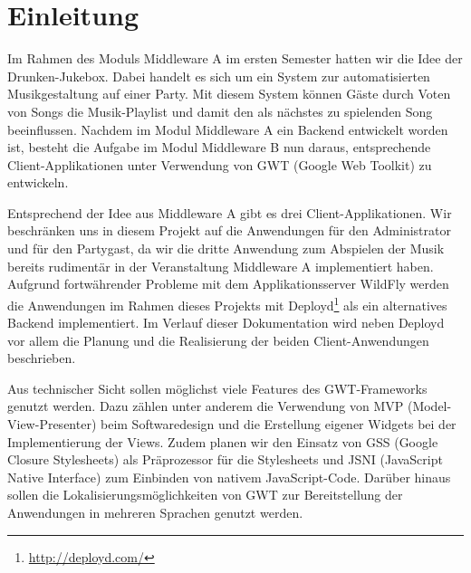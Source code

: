 \section{Einleitung}
Im Rahmen des Moduls Middleware A im ersten Semester hatten wir die Idee der Drunken-Jukebox. Dabei handelt es sich um ein System zur automatisierten Musikgestaltung auf einer Party. Mit diesem System können Gäste durch Voten von Songs die Musik-Playlist und damit den als nächstes zu spielenden Song beeinflussen. Nachdem im Modul Middleware A ein Backend entwickelt worden ist, besteht die Aufgabe im Modul Middleware B nun daraus, entsprechende Client-Applikationen unter Verwendung von GWT (Google Web Toolkit) zu entwickeln.

Entsprechend der Idee aus Middleware A gibt es drei Client-Applikationen. Wir beschränken uns in diesem Projekt auf die Anwendungen für den Administrator und für den Partygast, da wir die dritte Anwendung zum Abspielen der Musik bereits rudimentär in der Veranstaltung Middleware A implementiert haben. Aufgrund fortwährender Probleme mit dem Applikationsserver WildFly werden die Anwendungen im Rahmen dieses Projekts mit Deployd\footnote{\url{http://deployd.com/}} als ein alternatives Backend implementiert. Im Verlauf dieser Dokumentation wird neben Deployd vor allem die Planung und die Realisierung der beiden Client-Anwendungen beschrieben.

Aus technischer Sicht sollen möglichst viele Features des GWT-Frameworks genutzt werden. Dazu zählen unter anderem die Verwendung von MVP (Model-View-Presenter) beim Softwaredesign und die Erstellung eigener Widgets bei der Implementierung der Views. Zudem planen wir den Einsatz von GSS (Google Closure Stylesheets) als Präprozessor für die Stylesheets und JSNI (JavaScript Native Interface) zum Einbinden von nativem JavaScript-Code. Darüber hinaus sollen die Lokalisierungsmöglichkeiten von GWT zur Bereitstellung der Anwendungen in mehreren Sprachen genutzt werden.